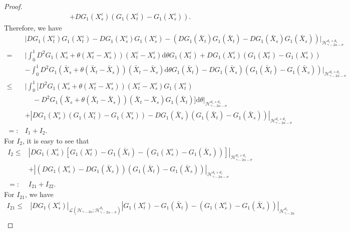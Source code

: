 \documentclass[10pt,a4paper]{amsart}
\begin{document}
\begin{proof}
\begin{align*}
		+DG_1(X_s^\varepsilon)(G_1(X_t^\varepsilon)-G_1(X_s^\varepsilon)).
	\end{align*}
	Therefore, we have
	\begin{align*}
		&\big|DG_1(X_t^\varepsilon)G_1(X_t^\varepsilon)-DG_1(X_s^\varepsilon)G_1(X_s^\varepsilon)-(DG_1(\bar{X}_t)G_1(\bar{X}_t)-DG_1(\bar{X}_s)G_1(\bar{X}_s)) \big|_{\mathcal H_{\gamma-2\alpha-\sigma}^{d_1 \times d_1}}	 \nonumber\\
		=& \bigg| \int_0^1 D^2 G_1 (X_s^\varepsilon+\theta(X_t^\varepsilon-X_s^\varepsilon)) (X_t^\varepsilon-X_s^\varepsilon) \mathrm{d} \theta G_1(X_t^\varepsilon)
		+DG_1(X_s^\varepsilon)(G_1(X_t^\varepsilon)-G_1(X_s^\varepsilon)) \nonumber\\
		&-\int_0^1 D^2 G_1(\bar{X}_s+\theta(\bar{X}_t-\bar{X}_s)) (\bar{X}_t-\bar{X}_s)  \mathrm{d} \theta G_1(\bar{X}_t)
		-DG_1(\bar{X}_s)(G_1(\bar{X}_t)-G_1(\bar{X}_s)) \bigg|_{\mathcal H_{\gamma-2\alpha-\sigma}^{d_1 \times d_1} } \nonumber\\
		\leq & \bigg| \int_0^1 \big[D^2 G_1 (X_s^\varepsilon+\theta(X_t^\varepsilon-X_s^\varepsilon)) (X_t^\varepsilon-X_s^\varepsilon)G_1(X_t^\varepsilon)\\
&~~~~~-D^2 G_1(\bar{X}_s+\theta(\bar{X}_t-\bar{X}_s)) (\bar{X}_t-\bar{X}_s) G_1(\bar{X}_t) \big] \mathrm{d} \theta \bigg|_{\mathcal H_{\gamma-2\alpha-\sigma}^{d_1 \times d_1} } \nonumber\\
		&+|DG_1(X_s^\varepsilon)(G_1(X_t^\varepsilon)-G_1(X_s^\varepsilon))-DG_1(\bar{X}_s)(G_1(\bar{X}_t)-G_1(\bar{X}_s))|_{\mathcal H_{\gamma-2\alpha-\sigma}^{d_1 \times d_1} }  \nonumber\\
		=:&I_1+I_2.
	\end{align*}
	For $I_2$, it is easy to see that
	\begin{align*}
		I_2 \leq & \left|DG_1(X_s^\varepsilon)[G_1(X_t^\varepsilon)-G_1(\bar{X}_t)-(G_1(X_s^\varepsilon)-G_1(\bar{X}_s) )]  \right|_{\mathcal H_{\gamma-2\alpha-\sigma}^{d_1 \times d_1} }  \nonumber\\
		&+\left|(DG_1(X_s^\varepsilon)-DG_1(\bar{X}_s)) (G_1(\bar{X}_t)-G_1(\bar{X}_s))  \right|_{\mathcal H_{\gamma-2\alpha-\sigma}^{d_1 \times d_1} } \nonumber\\
		=:& I_{21}+I_{22}.
	\end{align*}
	For $I_{21}$, we have
	\begin{align}\label{I21}
		I_{21} \leq &|DG_1(X_s^\varepsilon)|_{\mathcal L(\mathcal H_{\gamma-2\alpha}; \mathcal H_{\gamma-2\alpha-\sigma}^{d_1 } )}
		|G_1(X_t^\varepsilon)-G_1(\bar{X}_t)-(G_1(X_s^\varepsilon)-G_1(\bar{X}_s) )|_{\mathcal H_{\gamma-2\alpha}^{d_1}} \nonumber\\

\end{align}
\end{proof}
\end{document}
